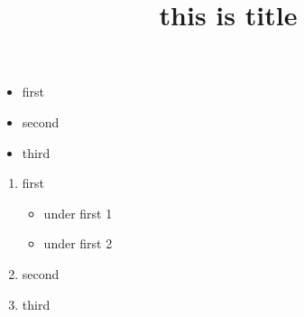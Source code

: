 \documentclass{article}
\title{this is title}
\begin{document}
\maketitle
    \begin{itemize}
        \item first
        \item second
        \item third
    \end{itemize}
    \begin{enumerate}
        \item first
        \begin{itemize}
            \item under first 1
            \item under first 2
        \end{itemize}
        \item second
        \item third
    \end{enumerate}
\end{document}
